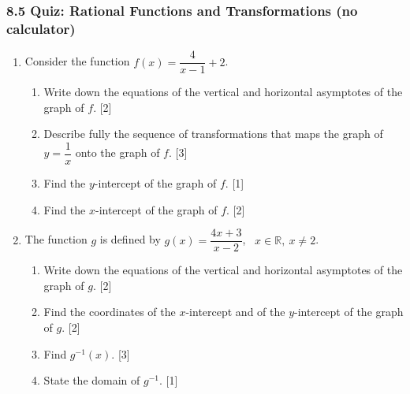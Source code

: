 \documentclass[12pt, twoside]{article}
\begin{document}
\newpage

\subsubsection*{8.5 Quiz: Rational Functions and Transformations (no calculator)}

\begin{enumerate}[itemsep=0.15cm]

\item[1.] [Maximum mark: 8]

Consider the function $f(x) = \dfrac{4}{x - 1} + 2$.

\begin{enumerate}[itemsep=0.15cm]
  \item Write down the equations of the vertical and horizontal asymptotes of the graph of $f$. \hfill [2]
  \item Describe fully the sequence of transformations that maps the graph of $y = \dfrac{1}{x}$ onto the graph of $f$. \hfill [3]
  \item Find the $y$-intercept of the graph of $f$. \hfill [1]
  \item Find the $x$-intercept of the graph of $f$. \hfill [2]
\end{enumerate}


\newpage

\item[2.] [Maximum mark: 8]

The function $g$ is defined by $g(x) = \dfrac{4x + 3}{x - 2}$, \ $x \in \mathbb{R}, \ x \ne 2$.

\begin{enumerate}[itemsep=0.15cm]
  \item Write down the equations of the vertical and horizontal asymptotes of the graph of $g$. \hfill [2]
  \item Find the coordinates of the $x$-intercept and of the $y$-intercept of the graph of $g$. \hfill [2]
  \item Find $g^{-1}(x)$. \hfill [3]
  \item State the domain of $g^{-1}$. \hfill [1]
\end{enumerate}


\end{enumerate}
\end{document}
